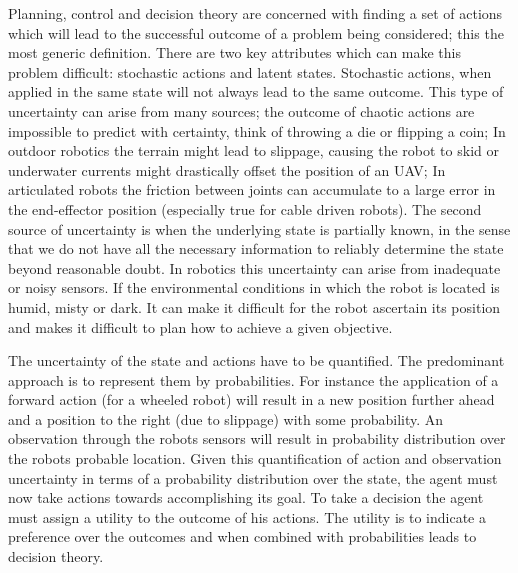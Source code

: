 Planning, control and decision theory are concerned with finding a set of actions which will lead to the 
successful outcome of a problem being considered; this the most generic definition. There are two 
key attributes which can make this problem difficult: stochastic actions and latent states. Stochastic 
actions, when applied in the same state will not always lead to the same outcome. This type of uncertainty 
can arise from many sources; the outcome of chaotic actions are impossible to predict with certainty, 
think of throwing a die or flipping a coin; In outdoor robotics the terrain might lead to slippage, causing 
the robot to skid or underwater currents might drastically offset the position of an UAV; In articulated 
robots the friction between joints can accumulate to a large error in the end-effector position (especially true 
for cable driven robots). 
The second source of uncertainty is when the underlying state is partially known, in the sense that we do not 
have all the necessary information to reliably determine the state beyond reasonable doubt. In robotics this 
uncertainty can arise from inadequate or noisy sensors. If the environmental conditions in which the robot 
is located is humid, misty or dark. It can make it difficult for the robot ascertain its position and 
makes it difficult to plan how to achieve a given objective.

The uncertainty of the state and actions have to be quantified. The predominant approach 
is to  represent them by probabilities. For instance the application of a forward action (for a wheeled robot) 
will result in a new position further ahead and a position to the right (due to slippage) with some probability.
An observation through the robots sensors will result in probability distribution over the robots probable location.
Given this quantification of action and observation uncertainty in terms of a probability distribution over the state, 
the agent must now take actions towards accomplishing its goal. To take a decision the agent must assign a utility 
to the outcome of his actions. The utility is to indicate a preference over the outcomes and when combined with 
probabilities leads to decision theory. 





